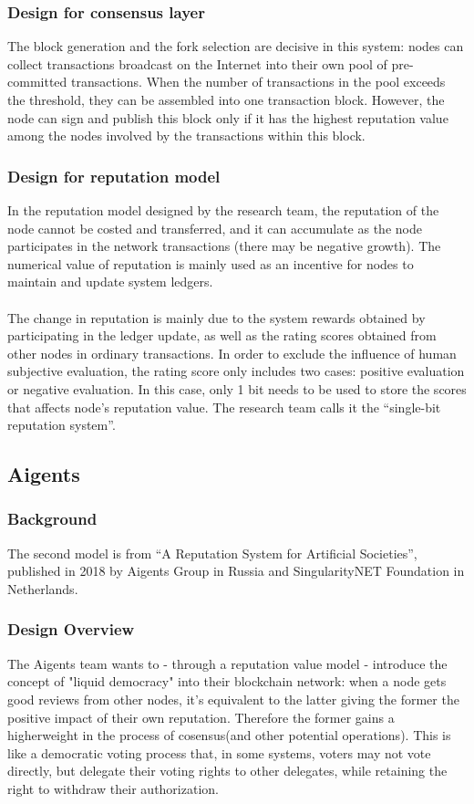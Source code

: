 \documentclass[]{article}
\begin{document}
\begin{CJK*}{UTF8}{gbsn}
		\subsubsection*{Design for consensus layer}  
	The block generation and the fork selection are decisive in this system: nodes can collect transactions broadcast on the Internet into their own pool of pre-committed transactions. When the number of transactions in the pool exceeds the threshold, they can be assembled into one transaction block. However, the node can sign and publish this block only if it has the highest reputation value among the nodes involved by the transactions within this block.
	\subsubsection*{Design for reputation model} 
	In the reputation model designed by the research team, the reputation of the node cannot be costed and transferred, and it can accumulate as the node participates in the network transactions (there may be negative growth). The numerical value of reputation is mainly used as an incentive for nodes to maintain and update system ledgers.
	\paragraph{} 
	The change in reputation is mainly due to the system rewards obtained by participating in the ledger update, as well as the rating scores obtained from other nodes in ordinary transactions. In order to exclude the influence of human subjective evaluation, the rating score only includes two cases: positive evaluation or negative evaluation. In this case, only 1 bit needs to be used to store the scores that affects node’s reputation value. The research team calls it the ``single-bit reputation system''.
	
	\subsection{Aigents} 
	\subsubsection*{Background}
	The second model is from ``A Reputation System for Artificial Societies'', published in 2018 by Aigents Group in Russia and SingularityNET Foundation in Netherlands.
	\subsubsection*{Design Overview}
	The Aigents team wants to - through a reputation value model - introduce the concept of "liquid democracy" into their blockchain network: when a node gets good reviews from other nodes, it's equivalent to the latter giving the former the positive impact of their own reputation. Therefore the former gains a higherweight in the process of cosensus(and other potential operations). This is like a democratic voting process that, in some systems, voters may not vote directly, but delegate their voting rights to other delegates, while retaining the right to withdraw their authorization.

\end{CJK*}
\end{document}
